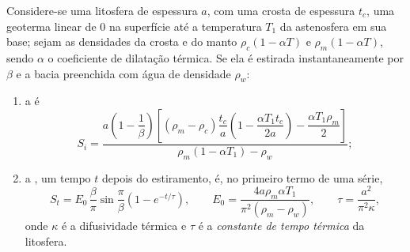 \begin{proposition}\label{prop:b2:basins-compared:stretching}
Considere-se uma litosfera de espessura $a$, com uma crosta de espessura $t_c$, uma geoterma linear de
$0$ na superfície até a temperatura $T_1$ da astenosfera em sua base; sejam as densidades da crosta e do manto
$\rho_c(1 - \alpha T)$ e $\rho_m(1 - \alpha T)$, sendo $\alpha$ o coeficiente de
dilatação térmica. Se ela é estirada instantaneamente por $\beta$ e a bacia preenchida com
água de densidade $\rho_w$:
\begin{enumerate}
  \item a  é
  \[
    S_i = \frac{a\left(1 - \dfrac{1}{\beta}\right)\left[(\rho_m - \rho_c)\dfrac{t_c}{a}
          \left(1 - \dfrac{\alpha T_1 t_c}{2a}\right) - \dfrac{\alpha T_1 \rho_m}{2}\right]}
          {\rho_m(1 - \alpha T_1) - \rho_w};
  \]
  \item a , um tempo $t$ depois do estiramento, é, no primeiro termo de uma série,
  \[
    S_t = E_0\,\frac{\beta}{\pi}\sin\frac{\pi}{\beta}\left(1 - e^{-t/\tau}\right),\qquad
    E_0 = \frac{4a\rho_m\alpha T_1}{\pi^2(\rho_m - \rho_w)},\qquad
    \tau = \frac{a^2}{\pi^2\kappa},
  \]
  onde $\kappa$ é a difusividade térmica e $\tau$ é a \emph{constante de tempo
  térmica} da litosfera.
\end{enumerate}
\end{proposition}

